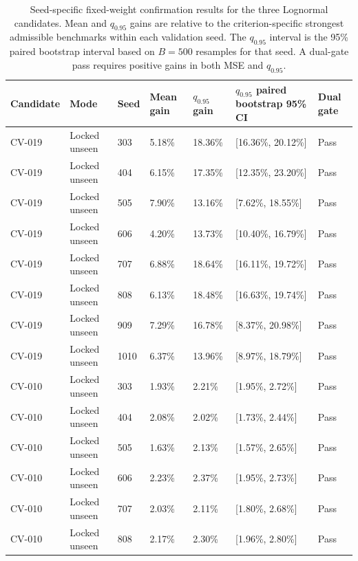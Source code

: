 \begin{table}[htbp]
\centering
\caption{Seed-specific fixed-weight confirmation results for the three
Lognormal candidates. Mean and $q_{0.95}$ gains are relative to the
criterion-specific strongest admissible benchmarks within each validation
seed. The $q_{0.95}$ interval is the 95\% paired bootstrap interval based on
$B=500$ resamples for that seed. A dual-gate pass requires positive gains
in both MSE and $q_{0.95}$.}
\label{tab:seed_specific_confirmation}
\scriptsize
\setlength{\tabcolsep}{2.3pt}
\begin{tabular}{@{}P{0.12\textwidth}P{0.12\textwidth}P{0.07\textwidth}
P{0.12\textwidth}P{0.12\textwidth}P{0.20\textwidth}P{0.09\textwidth}@{}}
\toprule
\textbf{Candidate} &
\textbf{Mode} &
\textbf{Seed} &
\textbf{Mean gain} &
\textbf{$q_{0.95}$ gain} &
\textbf{$q_{0.95}$ paired bootstrap 95\% CI} &
\textbf{Dual gate} \\
\midrule
CV-019 & Locked unseen & 303 & 5.18\% & 18.36\% & [16.36\%, 20.12\%] & Pass \\
CV-019 & Locked unseen & 404 & 6.15\% & 17.35\% & [12.35\%, 23.20\%] & Pass \\
CV-019 & Locked unseen & 505 & 7.90\% & 13.16\% & [7.62\%, 18.55\%] & Pass \\
CV-019 & Locked unseen & 606 & 4.20\% & 13.73\% & [10.40\%, 16.79\%] & Pass \\
CV-019 & Locked unseen & 707 & 6.88\% & 18.64\% & [16.11\%, 19.72\%] & Pass \\
CV-019 & Locked unseen & 808 & 6.13\% & 18.48\% & [16.63\%, 19.74\%] & Pass \\
CV-019 & Locked unseen & 909 & 7.29\% & 16.78\% & [8.37\%, 20.98\%] & Pass \\
CV-019 & Locked unseen & 1010 & 6.37\% & 13.96\% & [8.97\%, 18.79\%] & Pass \\
\addlinespace[0.35em]
CV-010 & Locked unseen & 303 & 1.93\% & 2.21\% & [1.95\%, 2.72\%] & Pass \\
CV-010 & Locked unseen & 404 & 2.08\% & 2.02\% & [1.73\%, 2.44\%] & Pass \\
CV-010 & Locked unseen & 505 & 1.63\% & 2.13\% & [1.57\%, 2.65\%] & Pass \\
CV-010 & Locked unseen & 606 & 2.23\% & 2.37\% & [1.95\%, 2.73\%] & Pass \\
CV-010 & Locked unseen & 707 & 2.03\% & 2.11\% & [1.80\%, 2.68\%] & Pass \\
CV-010 & Locked unseen & 808 & 2.17\% & 2.30\% & [1.96\%, 2.80\%] & Pass \\

\end{tabular}
\end{table}
